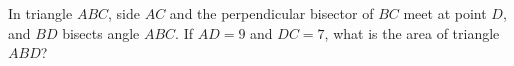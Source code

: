 In triangle $ABC$, side $AC$ and the perpendicular bisector of $BC$ meet at point $D$, and $BD$ bisects angle $ABC$. If $AD=9$ and $DC=7$, what is the area of triangle $ABD$?
